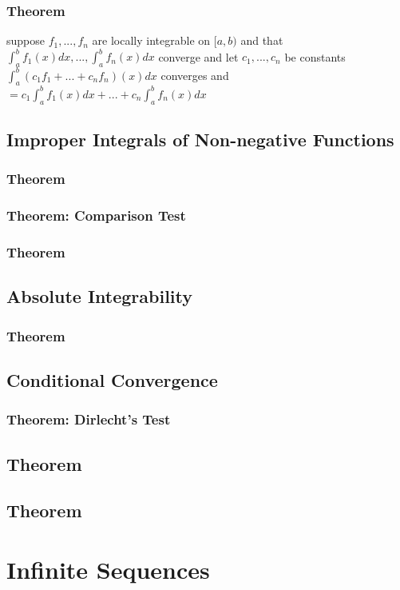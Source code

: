 \documentclass[12pt]{article}
\begin{document}
\subsubsection{Theorem}
suppose $f_{1}, ..., f_{n}$ are locally integrable on $[a,b)$ and that $\int_{a}^{b}f_{1}(x)dx, ..., \int_{a}^{b}f_{n}(x)dx$ converge and let $c_{1}, ..., c_{n}$ be constants \\
$\int_{a}^{b}(c_{1}f_{1} + ... + c_{n}f_{n})(x)dx$ converges and $= c_{1} \int_{a}^{b}f_{1}(x)dx + ... + c_{n} \int_{a}^{b}f_{n}(x)dx$
\subsection{Improper Integrals of Non-negative Functions}
\subsubsection{Theorem}
\subsubsection{Theorem: Comparison Test}
\subsubsection{Theorem}
\subsection{Absolute Integrability}

\subsubsection{Theorem}
\subsection{Conditional Convergence}

\subsubsection{Theorem: Dirlecht's Test}
\subsection{Theorem}
\subsection{Theorem}

\section{Infinite Sequences}
\end{document}
